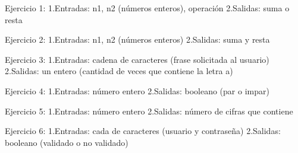 Ejercicio 1:
1.Entradas: n1, n2 (números enteros), operación
2.Salidas: suma o resta 

Ejercicio 2:
1.Entradas: n1, n2 (números enteros)
2.Salidas: suma y resta 

Ejercicio 3:
1.Entradas: cadena de caracteres (frase solicitada al usuario)
2.Salidas: un entero (cantidad de veces que contiene la letra a)

Ejercicio 4:
1.Entradas: número entero
2.Salidas: booleano (par o impar) 

Ejercicio 5:
1.Entradas: número entero
2.Salidas: número de cifras que contiene

Ejercicio 6:
1.Entradas: cada de caracteres (usuario y contraseña)
2.Salidas: booleano (validado o no validado)


